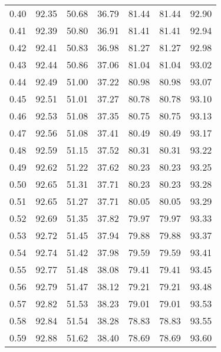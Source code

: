 \begin{tabular}{|c|c|c|c|c|c|c|}
      0.40 &     92.35 &     50.68 &      36.79 &   81.44 &      81.44 &         92.90 \\
      0.41 &     92.39 &     50.80 &      36.91 &   81.41 &      81.41 &         92.94 \\
      0.42 &     92.41 &     50.83 &      36.98 &   81.27 &      81.27 &         92.98 \\
      0.43 &     92.44 &     50.86 &      37.06 &   81.04 &      81.04 &         93.02 \\
      0.44 &     92.49 &     51.00 &      37.22 &   80.98 &      80.98 &         93.07 \\
      0.45 &     92.51 &     51.01 &      37.27 &   80.78 &      80.78 &         93.10 \\
      0.46 &     92.53 &     51.08 &      37.35 &   80.75 &      80.75 &         93.13 \\
      0.47 &     92.56 &     51.08 &      37.41 &   80.49 &      80.49 &         93.17 \\
      0.48 &     92.59 &     51.15 &      37.52 &   80.31 &      80.31 &         93.22 \\
      0.49 &     92.62 &     51.22 &      37.62 &   80.23 &      80.23 &         93.25 \\
      0.50 &     92.65 &     51.31 &      37.71 &   80.23 &      80.23 &         93.28 \\
      0.51 &     92.65 &     51.27 &      37.71 &   80.05 &      80.05 &         93.29 \\
      0.52 &     92.69 &     51.35 &      37.82 &   79.97 &      79.97 &         93.33 \\
      0.53 &     92.72 &     51.45 &      37.94 &   79.88 &      79.88 &         93.37 \\
      0.54 &     92.74 &     51.42 &      37.98 &   79.59 &      79.59 &         93.41 \\
      0.55 &     92.77 &     51.48 &      38.08 &   79.41 &      79.41 &         93.45 \\
      0.56 &     92.79 &     51.47 &      38.12 &   79.21 &      79.21 &         93.48 \\
      0.57 &     92.82 &     51.53 &      38.23 &   79.01 &      79.01 &         93.53 \\
      0.58 &     92.84 &     51.54 &      38.28 &   78.83 &      78.83 &         93.55 \\
      0.59 &     92.88 &     51.62 &      38.40 &   78.69 &      78.69 &         93.60 \\

\end{tabular}
